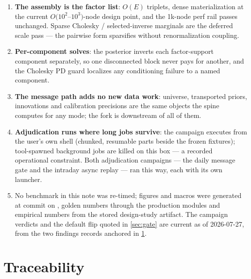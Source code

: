 \documentclass[11pt]{article}
\begin{document}
\begin{enumerate}[leftmargin=1.6em]
\item \textbf{The assembly is the factor list}: $O(E)$ triplets, dense
materialization at the current $O(10^2$--$10^3)$-node design point,
and the 1k-node perf rail passes unchanged.  Sparse Cholesky /
selected-inverse marginals are the deferred scale pass --- the
pairwise form sparsifies without renormalization coupling.
\item \textbf{Per-component solves}: the posterior inverts each
factor-support component separately, so one disconnected block never
pays for another, and the Cholesky PD guard localizes any conditioning
failure to a named component.
\item \textbf{The message path adds no new data work}: universe,
transported priors, innovations and calibration precisions are the
same objects the spine computes for any mode; the fork is downstream
of all of them.
\item \textbf{Adjudication runs where long jobs survive}: the campaign
executes from the user's own shell (chunked, resumable parts beside
the frozen fixtures); tool-spawned background jobs are killed on this
box --- a recorded operational constraint.  Both adjudication
campaigns --- the daily message gate and the intraday async replay ---
ran this way, each with its own launcher.
\item No benchmark in this note was re-timed; figures and macros were
generated at commit \texttt{\gmgencommit} on \gmgendate, golden
numbers through the production modules and empirical numbers from the
stored design-study artifact.  The campaign verdicts and the default
flip quoted in \cref{sec:gate} are current as of 2026-07-27, from the
two findings records anchored in \cref{app:trace}.
\end{enumerate}

\section{Traceability}
\label{app:trace}
\end{document}
